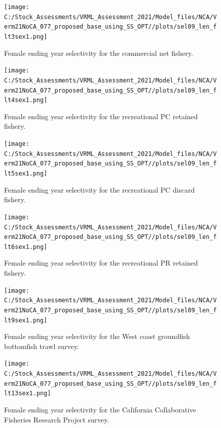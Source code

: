 \documentclass[
  english,
  a4paper,
]{article}
\begin{document}
\begin{figure}
\centering
\texttt{[image: C:/Stock\_Assessments/VRML\_Assessment\_2021/Model\_files/NCA/Verm21NoCA\_077\_proposed\_base\_using\_SS\_OPT//plots/sel09\_len\_flt3sex1.png]}
\caption{Female ending year selectivity for the commercial net fishery.\label{fig:endyr-selex-COM-NET}}
\end{figure}

\begin{figure}
\centering
\texttt{[image: C:/Stock\_Assessments/VRML\_Assessment\_2021/Model\_files/NCA/Verm21NoCA\_077\_proposed\_base\_using\_SS\_OPT//plots/sel09\_len\_flt4sex1.png]}
\caption{Female ending year selectivity for the recreational PC retained fishery.\label{fig:endyr-selex-REC-PC}}
\end{figure}

\begin{figure}
\centering
\texttt{[image: C:/Stock\_Assessments/VRML\_Assessment\_2021/Model\_files/NCA/Verm21NoCA\_077\_proposed\_base\_using\_SS\_OPT//plots/sel09\_len\_flt5sex1.png]}
\caption{Female ending year selectivity for the recreational PC discard fishery.\label{fig:endyr-selex-REC-PC-DIS}}
\end{figure}

\begin{figure}
\centering
\texttt{[image: C:/Stock\_Assessments/VRML\_Assessment\_2021/Model\_files/NCA/Verm21NoCA\_077\_proposed\_base\_using\_SS\_OPT//plots/sel09\_len\_flt6sex1.png]}
\caption{Female ending year selectivity for the recreational PR retained fishery.\label{fig:endyr-selex-REC-PR}}
\end{figure}

\begin{figure}
\centering
\texttt{[image: C:/Stock\_Assessments/VRML\_Assessment\_2021/Model\_files/NCA/Verm21NoCA\_077\_proposed\_base\_using\_SS\_OPT//plots/sel09\_len\_flt9sex1.png]}
\caption{Female ending year selectivity for the West coast groundfish bottomfish trawl survey.\label{fig:endyr-selex-NWFSC-TWL}}
\end{figure}

\begin{figure}
\centering
\texttt{[image: C:/Stock\_Assessments/VRML\_Assessment\_2021/Model\_files/NCA/Verm21NoCA\_077\_proposed\_base\_using\_SS\_OPT//plots/sel09\_len\_flt13sex1.png]}
\caption{Female ending year selectivity for the California Collaborative Fisheries Research Project survey.\label{fig:endyr-selex-CCFRP}}
\end{figure}
\end{document}
